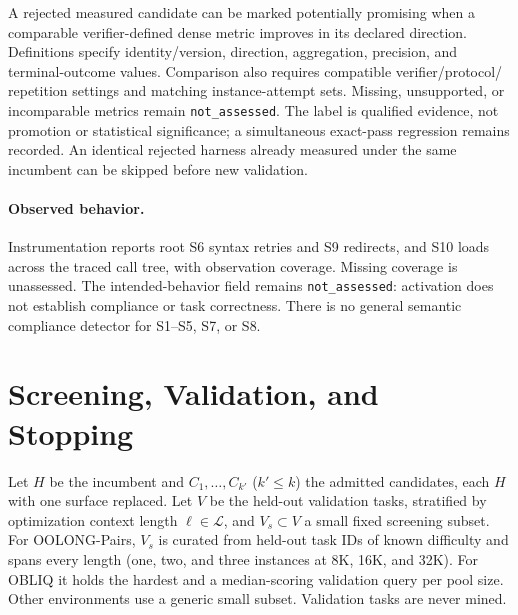 A rejected measured candidate can be marked potentially promising when a
comparable verifier-defined dense metric improves in its declared direction.
Definitions specify identity/version, direction, aggregation, precision, and
terminal-outcome values. Comparison also requires compatible verifier/protocol/
repetition settings and matching instance-attempt sets. Missing, unsupported, or
incomparable metrics remain \texttt{not\_assessed}. The label is qualified
evidence, not promotion or statistical significance; a simultaneous exact-pass
regression remains recorded. An identical rejected harness already measured
under the same incumbent can be skipped before new validation.

\paragraph{Observed behavior.}
Instrumentation reports root S6 syntax retries and S9 redirects, and S10 loads
across the traced call tree, with observation coverage. Missing coverage is
unassessed. The intended-behavior field remains \texttt{not\_assessed}: activation
does not establish compliance or task correctness. There is no general semantic
compliance detector for S1--S5, S7, or S8.

\section{Screening, Validation, and Stopping}
\label{app:validation}
\label{app:algorithm}

Let $H$ be the incumbent and $C_1,\dots,C_{k'}$ ($k'\le k$) the admitted
candidates, each $H$ with one surface replaced. Let $V$ be the held-out
validation tasks, stratified by optimization context length
$\ell\in\mathcal{L}$, and $V_s\subset V$ a small fixed screening subset. For
OOLONG-Pairs, $V_s$ is curated from held-out task IDs of known difficulty and
spans every length (one, two, and three instances at 8K, 16K, and 32K). For
OBLIQ it holds the hardest and a median-scoring validation query per pool size.
Other environments use a generic small subset. Validation tasks are never mined.

